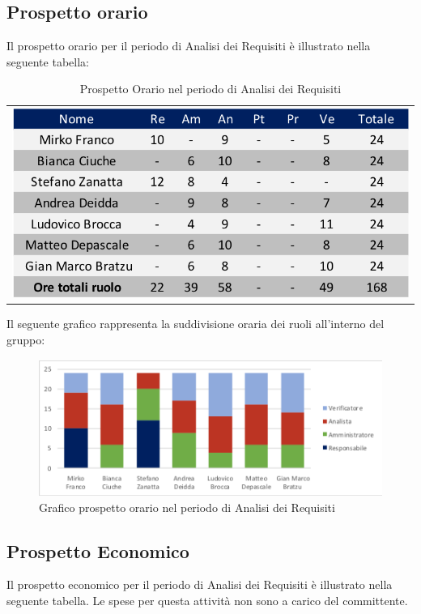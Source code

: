 \subsection{Prospetto orario}
Il prospetto orario per il periodo di Analisi dei Requisiti è illustrato nella seguente tabella:
\begin{table}[!ht]
	\begin{center}  	
		\begin{tabular}{c}
			\includegraphics{images/tabellaProspettoOrario.png}
		\end{tabular}
		\caption{Prospetto Orario nel periodo di Analisi dei Requisiti}
	\end{center}
\end{table}

Il seguente grafico rappresenta la suddivisione oraria dei ruoli all'interno del gruppo:
\begin{figure}[!ht]
	\begin{center}
		\includegraphics{images/grafoProspettoOrario.png}
		\caption{Grafico prospetto orario nel periodo di Analisi dei Requisiti }
	\end{center}
\end{figure}

\subsection{Prospetto Economico}
Il prospetto economico per il periodo di Analisi dei Requisiti è illustrato nella seguente tabella.
Le spese per questa attività non sono a carico del committente.

